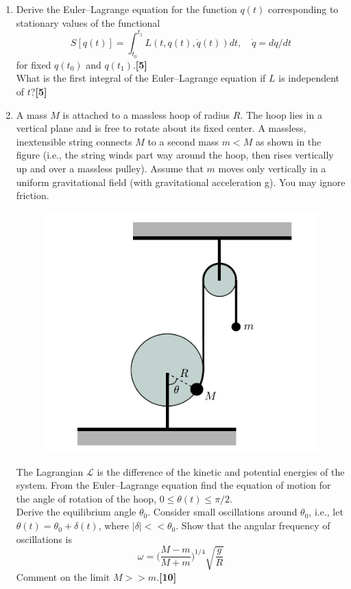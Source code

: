 \documentclass[a4paper]{article}
\begin{document}
\begin{qns}\leavevmode
\begin{enumerate}[label=(\roman*)]
\item Derive the Euler–Lagrange equation for the function $q(t)$ corresponding to stationary
values of the functional
$$S[q(t)]=\int_{t_0}^{t_1}L(t,q(t),\dot{q}(t))dt,\quad\dot{q}=dq/dt$$
for fixed $q(t_0)$ and $q(t_1)$.\hfill \textbf{[5]}\\[5pt]
What is the first integral of the Euler–Lagrange equation if $L$ is independent of $t$?\hfill \textbf{[5]}
\item A mass $M$ is attached to a massless hoop of radius $R$. The hoop lies in a vertical plane and is free to rotate about its fixed center. A massless, inextensible string connects $M$ to a second mass $m < M$ as shown in the figure (i.e., the string winds part way around the hoop, then rises vertically up and over a massless pulley). Assume that $m$ moves only vertically in a uniform gravitational field (with gravitational acceleration g). You may ignore friction.
\begin{figure}[H]
    \centering
    \includegraphics[width=\linewidth]{2014P1Q9.PNG}
\end{figure}
The Lagrangian $\mathcal{L}$ is the difference of the kinetic and potential energies of the system. From the Euler–Lagrange equation find the equation of motion for the angle of rotation of the hoop, $0\leq\theta(t)\leq\pi/2$.\\[5pt]
Derive the equilibrium angle $\theta_0$. Consider small oscillations around $\theta_0$, i.e., let
$\theta(t)=\theta_0+\delta(t)$, where $|\delta|<<\theta_0$. Show that the angular frequency of oscillations is
$$\omega=\bigg(\frac{M-m}{M+m}\bigg)^{1/4}\sqrt{\frac{g}{R}}$$
Comment on the limit $M>> m$.\hfill \textbf{[10]}
\end{enumerate}
\end{qns}
\end{document}
